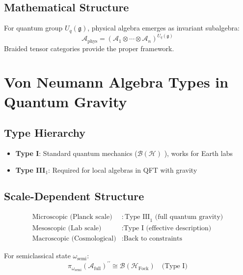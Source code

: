 \documentclass[aps,prl,reprint]{revtex4-2}
\begin{document}
\subsection{Mathematical Structure}

For quantum group $U_q(\mathfrak{g})$, physical algebra emerges as invariant
subalgebra: 
\begin{equation*}
\mathcal{A}_{\text{phys}} = (\mathcal{A}_1 \otimes \cdots \otimes \mathcal{A}%
_n)^{U_q(\mathfrak{g})} 
\end{equation*}
Braided tensor categories provide the proper framework.

\section{Von Neumann Algebra Types in Quantum Gravity}

\subsection{Type Hierarchy}

\begin{itemize}
\item \textbf{Type I}: Standard quantum mechanics ($\mathcal{B}(\mathcal{H})$%
), works for Earth labs

\item \textbf{Type III$_1$}: Required for local algebras in QFT with gravity
\end{itemize}

\subsection{Scale-Dependent Structure}

\begin{align*}
\text{Microscopic (Planck scale)} &: \text{Type III}_1 \text{ (full quantum
gravity)} \\
\text{Mesoscopic (Lab scale)} &: \text{Type I (effective description)} \\
\text{Macroscopic (Cosmological)} &: \text{Back to constraints}
\end{align*}

For semiclassical state $\omega_{\text{semi}}$: 
\begin{equation*}
\pi_{\omega_{\text{semi}}}(\mathcal{A}_{\text{full}})^{\prime\prime} \cong 
\mathcal{B}(\mathcal{H}_{\text{Fock}}) \quad \text{(Type I)} 
\end{equation*}
\end{document}
